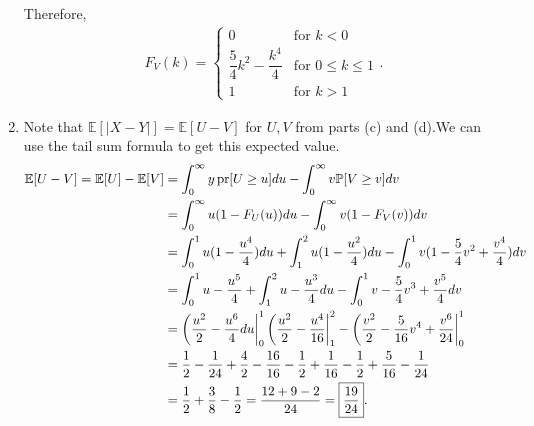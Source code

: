 \documentclass{article}
\newcommand{\p}{\mathbb{P}}
\newcommand{\ex}{\mathbb{E}}
\begin{document}
\begin{enumerate}[label=(\alph*)]
	Therefore, 
	\begin{align*} 
		F_{V}(k) = \begin{cases}
			0 & \text{for } k < 0 \\
			\dfrac{5}{4}k^2 - \dfrac{k^4}{4} & \text{for } 0 \leq k \leq 1 \\
			1 & \text{for } k > 1
		\end{cases}.
	\end{align*}
	\item Note that $\ex[|X-Y|] = \ex[U-V]$ for $U, V$ from parts (c) and (d).We can use the tail sum formula to get this expected value.
	\begin{align*}
\ex[U - V] = \ex[U] - \ex[V] &= \int_0^\infty y \pr[U \geq u] du - \int_0^\infty v \p[V \geq v] dv \\
&= \int_0^\infty u(1-F_U(u))du - \int_0^\infty v(1-F_V(v)) dv \\
&= \int_0^1 u(1-\frac{u^4}{4})du + \int_1^2 u(1-\frac{u^2}{4})du - \int_0^1 v(1-\frac{5}{4} v^2 + \frac{v^4}{4}) dv \\
&= \int_0^1 u - \frac{u^5}{4} + \int_1^2 u-\frac{u^3}{4} du - \int_0^1 v-\frac{5}{4}v^3+\frac{v^5}{4} dv \\
&= \left(\frac{u^2}{2} - \frac{u^6}{4} du \right|_0^1 \left(\frac{u^2}{2} - \frac{u^4}{16}\right|_1^2 - \left(\frac{v^2}{2} - \frac{5}{16}v^4 + \frac{v^6}{24}\right|^1_0 \\
&= \frac{1}{2} - \frac{1}{24} + \frac{4}{2} - \frac{16}{16} - \frac{1}{2} + \frac{1}{16} - \frac{1}{2} + \frac{5}{16} - \frac{1}{24} \\
&= \frac{1}{2} + \frac{3}{8} - \frac{1}{2} = \frac{12 + 9 - 2}{24} = \boxed{\frac{19}{24}}.
	\end{align*}
\end{enumerate}

\newpage
\end{document}
